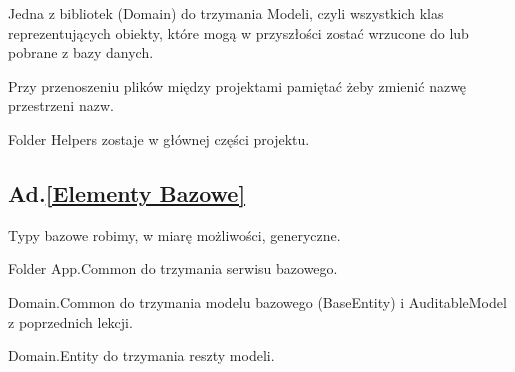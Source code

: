 \documentclass[10pt]{article}
\begin{document}
Jedna z bibliotek (Domain) do trzymania Modeli, czyli wszystkich klas reprezentujących obiekty, które mogą w przyszłości zostać wrzucone do lub pobrane z bazy danych.

Przy przenoszeniu plików między projektami pamiętać żeby zmienić nazwę przestrzeni nazw.

Folder Helpers zostaje w głównej części projektu.

\subsection{Ad.\ref{Elementy Bazowe}}
Typy bazowe robimy, w miarę możliwości, generyczne.

Folder App.Common do trzymania serwisu bazowego.

Domain.Common do trzymania modelu bazowego (BaseEntity) i AuditableModel z poprzednich lekcji.

Domain.Entity do trzymania reszty modeli.
\end{document}
